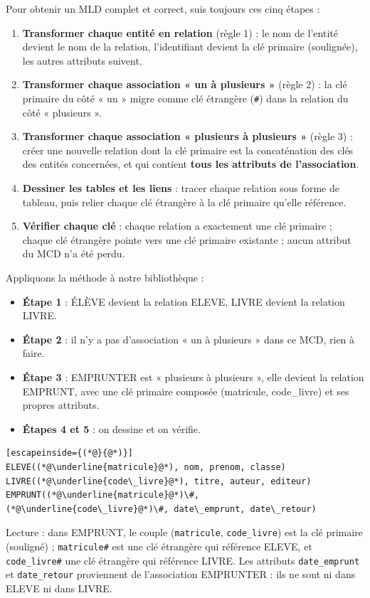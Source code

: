 \documentclass[11pt]{article}
\begin{document}
\begin{methode}
Pour obtenir un MLD complet et correct, suis toujours ces cinq étapes :
\begin{enumerate}
\item \textbf{Transformer chaque entité en relation} (règle 1) : le nom de l'entité devient le nom de la relation, l'identifiant devient la clé primaire (soulignée), les autres attributs suivent.
\item \textbf{Transformer chaque association « un à plusieurs »} (règle 2) : la clé primaire du côté « un » migre comme clé étrangère (\texttt{\#}) dans la relation du côté « plusieurs ».
\item \textbf{Transformer chaque association « plusieurs à plusieurs »} (règle 3) : créer une nouvelle relation dont la clé primaire est la concaténation des clés des entités concernées, et qui contient \textbf{tous les attributs de l'association}.
\item \textbf{Dessiner les tables et les liens} : tracer chaque relation sous forme de tableau, puis relier chaque clé étrangère à la clé primaire qu'elle référence.
\item \textbf{Vérifier chaque clé} : chaque relation a exactement une clé primaire ; chaque clé étrangère pointe vers une clé primaire existante ; aucun attribut du MCD n'a été perdu.
\end{enumerate}
\end{methode}

Appliquons la méthode à notre bibliothèque :

\begin{itemize}
\item \textbf{Étape 1} : ÉLÈVE devient la relation ELEVE, LIVRE devient la relation LIVRE.
\item \textbf{Étape 2} : il n'y a pas d'association « un à plusieurs » dans ce MCD, rien à faire.
\item \textbf{Étape 3} : EMPRUNTER est « plusieurs à plusieurs », elle devient la relation EMPRUNT, avec une clé primaire composée (matricule, code\_livre) et ses propres attributs.
\item \textbf{Étapes 4 et 5} : on dessine et on vérifie.
\end{itemize}

\begin{exemplebox}
\begin{lstlisting}[escapeinside={(*@}{@*)}]
ELEVE((*@\underline{matricule}@*), nom, prenom, classe)
LIVRE((*@\underline{code\_livre}@*), titre, auteur, editeur)
EMPRUNT((*@\underline{matricule}@*)\#, (*@\underline{code\_livre}@*)\#, date\_emprunt, date\_retour)
\end{lstlisting}
Lecture : dans EMPRUNT, le couple (\texttt{matricule}, \texttt{code\_livre}) est la clé primaire (souligné) ; \texttt{matricule\#} est une clé étrangère qui référence ELEVE, et \texttt{code\_livre\#} une clé étrangère qui référence LIVRE. Les attributs \texttt{date\_emprunt} et \texttt{date\_retour} proviennent de l'association EMPRUNTER : ils ne sont ni dans ELEVE ni dans LIVRE.
\end{exemplebox}
\end{document}
